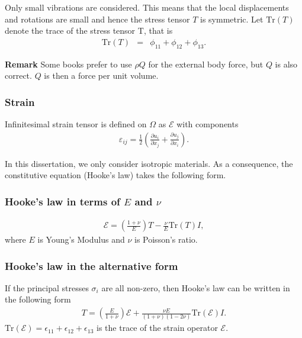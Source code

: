 \documentclass[../../main.tex]{subfiles}
\begin{document}
Only small vibrations are considered. This means that the local displacements and rotations are small and hence the stress tensor $T$ is symmetric. Let $\textrm{Tr}(T)$ denote the trace of the stress tensor T, that is
\begin{eqnarray}
	\textrm{Tr}(T) & = & \phi_{11} + \phi_{12} + \phi_{13}. \label{eq:stress_tensor_t}
\end{eqnarray}

\textbf{Remark} Some books prefer to use $\rho Q$ for the external body force, but $Q$ is also correct. $Q$ is then a force per unit volume.

\subsubsection*{Strain}\label{sssec:3D_Model:Strain}
Infinitesimal strain tensor is defined on $\Omega$ as $\mathcal{E}$ with components
\begin{eqnarray}
	\varepsilon_{ij} = \frac{1}{2}\left( \frac{\partial u_i}{\partial x_j} + \frac{\partial u_j}{\partial x_i} \right). \label{eq:3D_Model:Strain}
\end{eqnarray}

In this dissertation, we only consider isotropic materials. As a consequence, the constitutive equation (Hooke's law) takes the following form.

\subsubsection*{Hooke's law in terms of $E$ and $\nu$}\label{sssec:3D_Model:Hooke'sLaw1}
\begin{eqnarray}
	\mathcal{E} = \left( \frac{1+\nu}{E} \right)T - \frac{\nu}{E}\textrm{Tr}(T)I,  \label{eq:3D_Model:HL}
\end{eqnarray} where $E$ is Young's Modulus and $\nu$ is Poisson's ratio.


\subsubsection*{Hooke's law in the alternative form}\label{sssec:3D_Model:Hooke'sLaw2}
If the principal stresses $\sigma_i$ are all non-zero, then Hooke's law can be written in the following form
\begin{eqnarray}
	T = \left( \frac{E}{1+\nu} \right)\mathcal{E} + \frac{\nu E}{(1+\nu)(1-2\nu)}\textrm{Tr}(\mathcal{E})I \label{eq:3D_Model:CE}.
\end{eqnarray}
$\textrm{Tr}(\mathcal{E}) = \epsilon_{11} + \epsilon_{12} + \epsilon_{13}$ is the trace of the strain operator $\mathcal{E}$.\\
\end{document}
